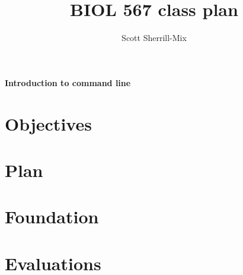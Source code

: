 \documentclass[12pt]{article}
\title{BIOL 567 class plan}
\date{}
\author{Scott Sherrill-Mix}
\begin{document}
\thispagestyle{plain}
\begin{center}
	\Large{\textbf{Introduction to command line}}
\end{center}

\section{Objectives}

\section{Plan}

\section{Foundation}

\section{Evaluations}
\end{document}
